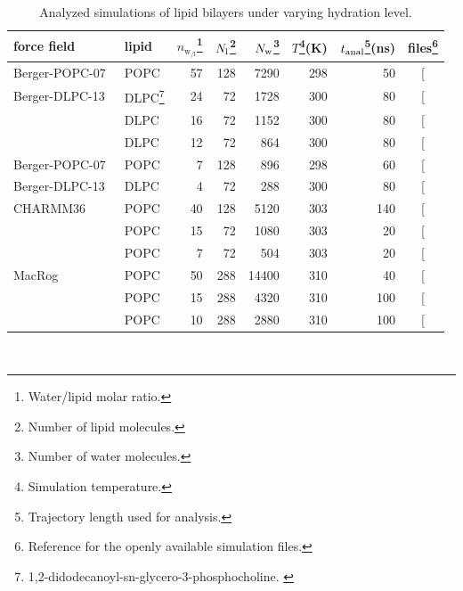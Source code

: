 \documentclass[journal=jpcbfk,manuscript=article,layout=twocolumn]{achemso}
\begin{document}
\begin{table}[]
\caption{Analyzed simulations of lipid bilayers under varying hydration level.}
\begin{minipage}[t]{\columnwidth}
\resizebox{\columnwidth}{!} {
\begin{tabular}{llrrrrrc}
force field  &
lipid  &
$n_{{\mathrm w\!}_{/\mathrm l}}$\footnote{Water/lipid molar ratio.}  &
$N_{\rm l}$\footnote{Number of lipid molecules.}  &
$N_{\rm w}$\footnote{Number of water molecules.} &
$T$\footnote{Simulation temperature.}(K)  &
$t_{{\rm anal}}$\footnote{Trajectory length used for analysis.}(ns) &
files\footnote{Reference for the openly available simulation files.} \tabularnewline
\hline 
Berger-POPC-07~\cite{ollila07a} 
	& POPC  & 57  & 128  & 7290  & 298  & 50 & {[}\!\!\citenum{bergerFILESpopc}{]} \tabularnewline
Berger-DLPC-13~\cite{kanduc13}
	& DLPC\footnote{1,2-didodecanoyl-sn-glycero-3-phosphocholine. \label{fn:DLPC}}  & 24  & 72  & 1728  & 300  & 80  & {[}\!\!\citenum{bergerFILESdlpc24}{]} \tabularnewline
	& DLPC\footref{fn:DLPC}  & 16  & 72  & 1152  & 300  & 80  & {[}\!\!\citenum{bergerFILESdlpc16}{]} \tabularnewline
	& DLPC\footref{fn:DLPC}  & 12  & 72  & 864  & 300  & 80  & {[}\!\!\citenum{bergerFILESdlpc12}{]} \tabularnewline
Berger-POPC-07~\cite{ollila07a} 
	& POPC  & 7  & 128  & 896  & 298  & 60  & {[}\!\!\citenum{bergerDEHYDfiles}{]} \tabularnewline
Berger-DLPC-13~\cite{kanduc13}
	& DLPC\footref{fn:DLPC}  & 4  & 72  & 288  & 300  & 80  & {[}\!\!\citenum{bergerFILESdlpc4}{]} \tabularnewline[1.0ex]
CHARMM36\cite{klauda10} 
	& POPC  & 40  & 128  & 5120  & 303  & 140 & {[}\!\!\citenum{charmm36files}{]} \tabularnewline
	& POPC  & 15  & 72  & 1080  & 303  & 20  & {[}\!\!\citenum{charmm36files15wPERl}{]} \tabularnewline
	& POPC  & 7  & 72  & 504  & 303  & 20  & {[}\!\!\citenum{charmm36files7wPERl}{]} \tabularnewline[1.0ex]
MacRog\cite{kulig15} 
	& POPC  & 50  & 288  & 14400  & 310  & 40  & {[}\!\!\citenum{macrogdehydFILES}{]} \tabularnewline
	& POPC  & 15  & 288  & 4320  & 310  & 100 & {[}\!\!\citenum{macrogdehydFILES}{]} \tabularnewline
	& POPC  & 10  & 288  & 2880  & 310  & 100  & {[}\!\!\citenum{macrogdehydFILES}{]} \tabularnewline
\end{tabular}
}
\label{tab:hydr}
\end{minipage}
\\
\end{table}
\end{document}

